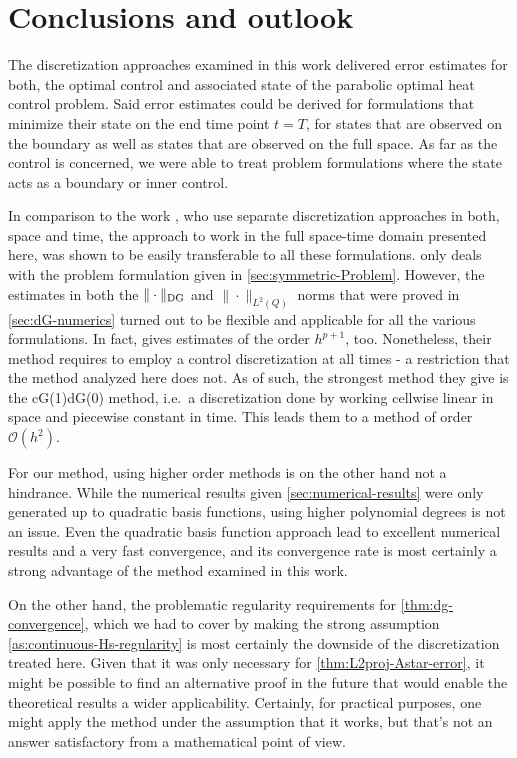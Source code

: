 \documentclass[../thesis.tex]{subfiles}
\begin{document}
\chapter{Conclusions and outlook}
\label{sec:conclusions}
The discretization approaches examined in this work delivered error estimates for both, the optimal control and associated state of the parabolic optimal heat control problem.
Said error estimates could be derived for formulations that minimize their state on the end time point $t = T$, for states that are observed on the boundary as well as states that are observed on the full space. As far as the control is concerned, we were able to treat problem formulations where the state acts as a boundary or inner control.

In comparison to the work \cite{MeidnerVexler-I}, who use separate discretization approaches in both, space and time, the approach to work in the full space-time domain presented here, was shown to be easily transferable to all these formulations.
\cite{MeidnerVexler-I} only deals with the problem formulation given in \cref{sec:symmetric-Problem}.
However, the estimates in both the $\| \cdot \|_{\mathrm{DG}}$ and $\| \cdot \|_{L^2(Q)}$ norms that were proved in \cref{sec:dG-numerics} turned out to be flexible and applicable for all the various formulations. In fact, \cite{MeidnerVexler-I} gives estimates of the order $h^{p+1}$, too.
Nonetheless, their method requires to employ a control discretization at all times - a restriction that the method analyzed here does not. As of such, the strongest method they give is the cG(1)dG(0) method, i.e.\ a discretization done by working cellwise linear in space and piecewise constant in time.
This leads them to a method of order $\mathcal{O}(h^2)$.

For our method, using higher order methods is on the other hand not a hindrance. While the numerical results given \cref{sec:numerical-results} were only generated up to quadratic basis functions, using higher polynomial degrees is not an issue.
Even the quadratic basis function approach lead to excellent numerical results and a very fast convergence, and its convergence rate is most certainly a strong advantage of the method examined in this work.

On the other hand, the problematic regularity requirements for \cref{thm:dg-convergence}, which we had to cover by making the strong assumption \cref{as:continuous-Hs-regularity} is most certainly the downside of the discretization treated here. Given that it was only necessary for \cref{thm:L2proj-Astar-error}, it might be possible to find an alternative proof in the future that would enable the theoretical results a wider applicability.
Certainly, for practical purposes, one might apply the method under the assumption that it works, but that's not an answer satisfactory from a mathematical point of view.
\end{document}
